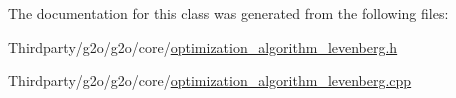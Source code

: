 The documentation for this class was generated from the following files\+:\begin{DoxyCompactItemize}
\item 
Thirdparty/g2o/g2o/core/\mbox{\hyperlink{optimization__algorithm__levenberg_8h}{optimization\+\_\+algorithm\+\_\+levenberg.\+h}}\item 
Thirdparty/g2o/g2o/core/\mbox{\hyperlink{optimization__algorithm__levenberg_8cpp}{optimization\+\_\+algorithm\+\_\+levenberg.\+cpp}}\end{DoxyCompactItemize}
